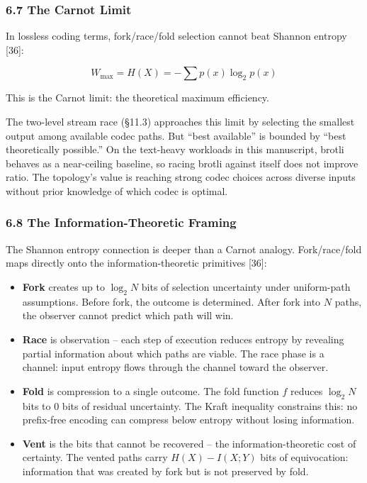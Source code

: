 \documentclass[
  11pt,
]{article}
\begin{document}
\subsubsection{6.7 The Carnot Limit}\label{the-carnot-limit}

In lossless coding terms, fork/race/fold selection cannot beat Shannon
entropy {[}36{]}:

\[
W_{\max} = H(X) = -\sum p(x) \log_2 p(x)
\]

This is the Carnot limit: the theoretical maximum efficiency.

The two-level stream race (§11.3) approaches this limit by selecting the
smallest output among available codec paths. But ``best available'' is
bounded by ``best theoretically possible.'' On the text-heavy workloads
in this manuscript, brotli behaves as a near-ceiling baseline, so racing
brotli against itself does not improve ratio. The topology's value is
reaching strong codec choices across diverse inputs without prior
knowledge of which codec is optimal.

\subsubsection{6.8 The Information-Theoretic
Framing}\label{the-information-theoretic-framing}

The Shannon entropy connection is deeper than a Carnot analogy.
Fork/race/fold maps directly onto the information-theoretic primitives
{[}36{]}:

\begin{itemize}
\item
  \textbf{Fork} creates up to \(\log_2 N\) bits of selection uncertainty
  under uniform-path assumptions. Before fork, the outcome is
  determined. After fork into \(N\) paths, the observer cannot predict
  which path will win.
\item
  \textbf{Race} is observation -- each step of execution reduces entropy
  by revealing partial information about which paths are viable. The
  race phase is a channel: input entropy flows through the channel
  toward the observer.
\item
  \textbf{Fold} is compression to a single outcome. The fold function
  \(f\) reduces \(\log_2 N\) bits to 0 bits of residual uncertainty. The
  Kraft inequality constrains this: no prefix-free encoding can compress
  below entropy without losing information.
\item
  \textbf{Vent} is the bits that cannot be recovered -- the
  information-theoretic cost of certainty. The vented paths carry
  \(H(X) - I(X;Y)\) bits of equivocation: information that was created
  by fork but is not preserved by fold.
\end{itemize}
\end{document}
